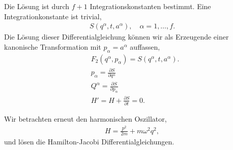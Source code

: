 Die Lösung ist durch $f+1$ Integrationskonstanten bestimmt. Eine
Integrationkonstante ist trivial,
\begin{align*}
S(q^\alpha,t,a^\alpha),\quad \alpha = 1,\ldots,f.
\end{align*}
Die Lösung dieser Differentialgleichung können wir als Erzeugende einer
kanonische Transformation mit $p_\alpha = a^\alpha$ auffassen,
\begin{align*}
&F_2(q^\alpha,p_\alpha) = S(q^\alpha, t, a^\alpha).\\
&p_\alpha = \frac{\partial S}{\partial q^\alpha}\\
&Q^\alpha = \frac{\partial S}{\partial p_\alpha}\\
&H' = H+\frac{\partial S}{\partial t} = 0.
\end{align*}

\begin{bsp}
Wir betrachten erneut den harmonischen Oszillator,
\begin{align*}
H = \frac{p^2}{2m} + m\omega^2q^2,
\end{align*}
und lösen die Hamilton-Jacobi Differentialgleichungen.


\end{bsp}

